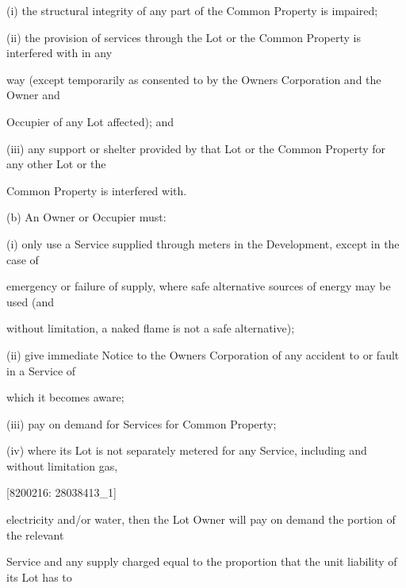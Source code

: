 \documentclass{article}
\begin{document}
{\fontsize{9.962}{1}(i) the structural integrity of any part of the Common Property is impaired; }

{\fontsize{9.962}{1}(ii) the provision of services through the Lot or the Common Property is interfered with in any }

{\fontsize{10.02}{1}way (except temporarily as consented to by the Owners Corporation and the Owner and }

{\fontsize{10.02}{1}Occupier of any Lot affected); and }

{\fontsize{9.962}{1}(iii) any support or shelter provided by that Lot or the Common Property for any other Lot or the }

{\fontsize{10.02}{1}Common Property is interfered with. }

{\fontsize{9.962}{1}(b) An Owner or Occupier must: }

{\fontsize{9.962}{1}(i) only use a Service supplied through meters in the Development, except in the case of }

{\fontsize{10.02}{1}emergency or failure of supply, where safe alternative sources of energy may be used (and }

{\fontsize{10.02}{1}without limitation, a naked flame is not a safe alternative); }

{\fontsize{9.962}{1}(ii) give immediate Notice to the Owners Corporation of any accident to or fault in a Service of }

{\fontsize{10.02}{1}which it becomes aware; }

{\fontsize{9.962}{1}(iii) pay on demand for Services for Common Property; }

{\fontsize{9.962}{1}(iv) where its Lot is not separately metered for any Service, including and without limitation gas, }

\newpage
















{\fontsize{7.02}{1}[8200216: 28038413\_1] }

{\fontsize{10.02}{1}electricity and/or water, then the Lot Owner will pay on demand the portion of the relevant }

{\fontsize{10.02}{1}Service and any supply charged equal to the proportion that the unit liability of its Lot has to }
\end{document}
